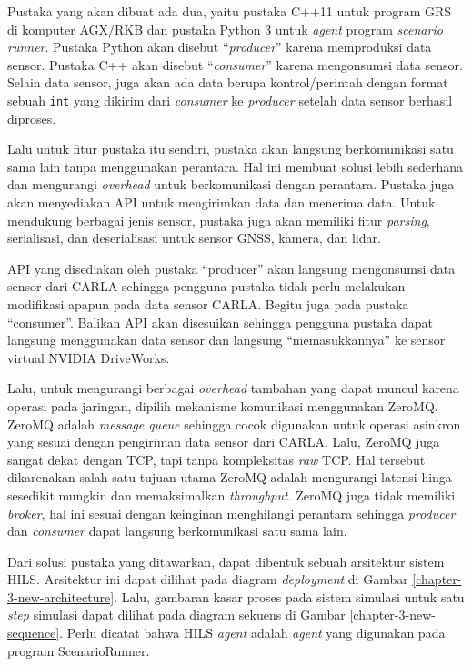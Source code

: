 Pustaka yang akan dibuat ada dua, yaitu pustaka C++11 untuk program GRS di
komputer AGX/RKB dan pustaka Python 3 untuk \textit{agent} program
\textit{scenario runner}. Pustaka Python akan disebut ``\textit{producer}''
karena memproduksi data sensor. Pustaka C++ akan disebut ``\textit{consumer}''
karena mengonsumsi data sensor. Selain data sensor, juga akan ada data berupa
kontrol/perintah dengan format sebuah \texttt{int} yang dikirim dari
\textit{consumer} ke \textit{producer} setelah data sensor berhasil diproses.

Lalu untuk fitur pustaka itu sendiri, pustaka akan langsung berkomunikasi satu
sama lain tanpa menggunakan perantara. Hal ini membuat solusi lebih sederhana
dan mengurangi \textit{overhead} untuk berkomunikasi dengan perantara. Pustaka
juga akan menyediakan API untuk mengirimkan data dan menerima data. Untuk
mendukung berbagai jenis sensor, pustaka juga akan memiliki fitur
\textit{parsing}, serialisasi, dan deserialisasi untuk sensor GNSS, kamera, dan
lidar.

API yang disediakan oleh pustaka ``producer'' akan langsung mengonsumsi data
sensor dari CARLA sehingga pengguna pustaka tidak perlu melakukan modifikasi
apapun pada data sensor CARLA. Begitu juga pada pustaka ``consumer''. Balikan
API akan disesuikan sehingga pengguna pustaka dapat langsung menggunakan data
sensor dan langsung ``memasukkannya'' ke sensor virtual NVIDIA DriveWorks.

Lalu, untuk mengurangi berbagai \textit{overhead} tambahan yang dapat muncul
karena operasi pada jaringan, dipilih mekanisme komunikasi menggunakan ZeroMQ.
ZeroMQ adalah \textit{message queue} sehingga cocok digunakan untuk operasi
asinkron yang sesuai dengan pengiriman data sensor dari CARLA. Lalu, ZeroMQ juga
sangat dekat dengan TCP, tapi tanpa kompleksitas \textit{raw} TCP. Hal tersebut
dikarenakan salah satu tujuan utama ZeroMQ adalah mengurangi latensi hinga
sesedikit mungkin dan memaksimalkan \textit{throughput}. ZeroMQ juga tidak
memiliki \textit{broker}, hal ini sesuai dengan keinginan menghilangi perantara
sehingga \textit{producer} dan \textit{consumer} dapat langsung berkomunikasi
satu sama lain.

Dari solusi pustaka yang ditawarkan, dapat dibentuk sebuah arsitektur sistem
HILS. Arsitektur ini dapat dilihat pada diagram \textit{deployment} di Gambar
\ref{chapter-3-new-architecture}. Lalu, gambaran kasar proses pada sistem
simulasi untuk satu \textit{step} simulasi dapat dilihat pada diagram
sekuens di Gambar \ref{chapter-3-new-sequence}. Perlu dicatat bahwa HILS
\textit{agent} adalah \textit{agent} yang digunakan pada program
ScenarioRunner.

